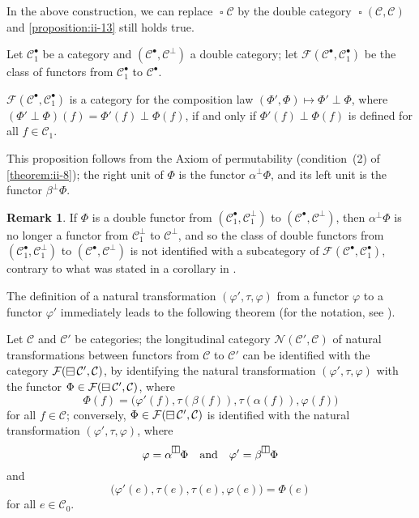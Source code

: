 \documentclass[a4paper,fleqn]{article}
\theoremstyle{plain}
\newenvironment{theorem}[1]
  {\renewcommand\theinnertheorem{#1}\innertheorem}
  {\endinnertheorem}
\newenvironment{proposition}[1]
  {\renewcommand\theinnerproposition{#1}\innerproposition}
  {\endinnerproposition}
\theoremstyle{definition}
\newtheorem*{remark}{Remark}
\newcommand{\oldpage}[1]{{\marginpar{\footnotesize$\bigg\vert$\,\,\,\,\textit{p.~#1}}}}
\newcommand{\textand}{\quad\text{and}\quad}
\newcommand{\CC}{\mathcal{C}}
\newcommand{\FF}{\mathcal{F}}
\newcommand{\NN}{\mathcal{N}}
\newcommand{\hsqbox}{{\boxminus}}
\newcommand{\vsqbox}{{\rotatebox{90}{$\boxminus$}}}
\DeclareMathOperator{\sq}{\square}
\DeclareMathOperator{\hsq}{\raisebox{-.05em}{$\hsqbox$}}
\newcommand{\smallbullet}{\bullet}
\begin{document}
In the above construction, we can replace $\sq\CC$ by the double category $\sq(\CC,\CC)$ and \cref{proposition:ii-13} still holds true.

Let $\CC_1^\smallbullet$ be a category and $(\CC^\smallbullet,\CC^\perp)$ a double category;
let $\FF(\CC^\smallbullet,\CC_1^\smallbullet)$ be the class of functors from $\CC_1^\smallbullet$ to $\CC^\smallbullet$.

\begin{proposition}{14}
\label{proposition:ii-14}
  $\FF(\CC^\smallbullet,\CC_1^\smallbullet)$ is a category for the composition law $(\Phi',\Phi)\mapsto\Phi'\perp\Phi$, where $(\Phi'\perp\Phi)(f)=\Phi'(f)\perp\Phi(f)$, if and only if $\Phi'(f)\perp\Phi(f)$ is defined for all $f\in\CC_1$.
\end{proposition}

This proposition follows from the Axiom of permutability (condition~(2) of \cref{theorem:ii-8});
the right unit of $\Phi$ is the functor $\alpha^\perp\Phi$, and its left unit is the functor $\beta^\perp\Phi$.

\begin{remark}
  If $\Phi$ is a double functor from $(\CC_1^\smallbullet,\CC_1^\perp)$ to $(\CC^\smallbullet,\CC^\perp)$, then $\alpha^\perp\Phi$ is no longer a functor from $\CC_1^\perp$ to $\CC^\perp$, and so the class of double functors from $(\CC_1^\smallbullet,\CC_1^\perp)$ to $(\CC^\smallbullet,\CC^\perp)$ is not identified with a subcategory of $\FF(\CC^\smallbullet,\CC_1^\smallbullet)$, contrary to what was stated in a corollary in \cite{3e}.
\end{remark}

The definition of a natural transformation $(\varphi',\tau,\varphi)$ from a functor $\varphi$ to a functor $\varphi'$ immediately leads to the following theorem (for the notation, see \cite{3d}).

\begin{theorem}{7}
\label{theorem:ii-7}
  Let $\CC$ and $\CC'$ be categories;
  the longitudinal category $\NN(\CC',\CC)$ of natural transformations between functors from $\CC$ to $\CC'$ can be identified with the category $\FF(\hsq\CC',\CC)$, by identifying the natural transformation $(\varphi',\tau,\varphi)$ with the functor $\Phi\in\FF(\hsq\CC',\CC)$, where
  \[
    \Phi(f)
    = \big(
      \varphi'(f), \tau(\beta(f)), \tau(\alpha(f)), \varphi(f)
    \big)
  \]
  for all $f\in\CC$;
  \oldpage{396}
  conversely, $\Phi\in\FF(\hsq\CC',\CC)$ is identified with the natural transformation $(\varphi',\tau,\varphi)$, where
  \[
    \varphi=\alpha^\vsqbox\Phi
    \textand
    \varphi'=\beta^\vsqbox\Phi
  \]
  and
  \[
    \big(
      \varphi'(e), \tau(e), \tau(e), \varphi(e)
    \big)
    = \Phi(e)
  \]
  for all $e\in\CC_0$.
\end{theorem}
\end{document}
